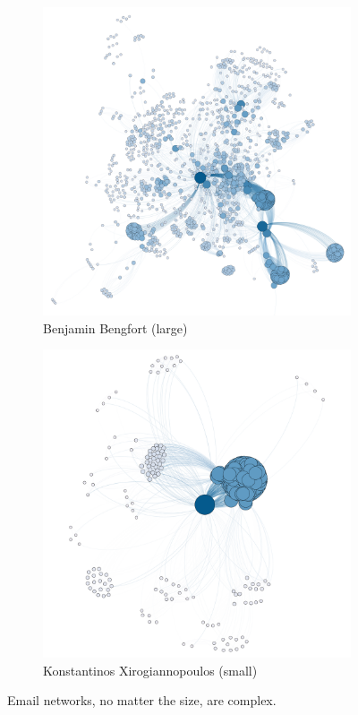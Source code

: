 \documentclass[11pt,letterpaper]{article}
\begin{document}
\begin{figure}[h]
	\centering
	\begin{subfigure}{0.49\textwidth}
		\centering
		\includegraphics[width=\textwidth]{figures/benjamin_descriptive.png}
		\caption{\textsf{Benjamin Bengfort (large)}}
        \label{fig:benjamin_descriptive}
	\end{subfigure} \hfill
	\begin{subfigure}{0.49\textwidth}
		\centering
		\includegraphics[width=\textwidth]{figures/kostas_descriptive.png}
		\caption{\textsf{Konstantinos Xirogiannopoulos (small)}}
        \label{fig:kostas_descriptive}
	\end{subfigure}
    \caption{\textsf{Email networks, no matter the size, are complex.}}
    \label{fig:descriptive}
\end{figure}
\end{document}
